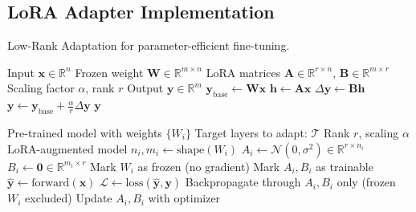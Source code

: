 \subsection{LoRA Adapter Implementation}

Low-Rank Adaptation for parameter-efficient fine-tuning.

\begin{algorithm}[H]
\caption{LoRA Layer Forward Pass}
\label{alg:lora_forward}
\begin{algorithmic}[1]
\REQUIRE Input $\mathbf{x} \in \mathbb{R}^{n}$
\REQUIRE Frozen weight $\mathbf{W} \in \mathbb{R}^{m \times n}$
\REQUIRE LoRA matrices $\mathbf{A} \in \mathbb{R}^{r \times n}$, $\mathbf{B} \in \mathbb{R}^{m \times r}$
\REQUIRE Scaling factor $\alpha$, rank $r$
\ENSURE Output $\mathbf{y} \in \mathbb{R}^{m}$
\STATE $\mathbf{y}_{\text{base}} \gets \mathbf{W} \mathbf{x}$ 
\STATE $\mathbf{h} \gets \mathbf{A} \mathbf{x}$ 
\STATE $\Delta\mathbf{y} \gets \mathbf{B} \mathbf{h}$ 
\STATE $\mathbf{y} \gets \mathbf{y}_{\text{base}} + \frac{\alpha}{r} \Delta\mathbf{y}$ 
\RETURN $\mathbf{y}$
\end{algorithmic}
\end{algorithm}

\begin{algorithm}[H]
\caption{LoRA Initialization and Training}
\label{alg:lora_init}
\begin{algorithmic}[1]
\REQUIRE Pre-trained model with weights $\{W_i\}$
\REQUIRE Target layers to adapt: $\mathcal{T}$
\REQUIRE Rank $r$, scaling $\alpha$
\ENSURE LoRA-augmented model
\STATE {}
    \STATE $n_i, m_i \gets \text{shape}(W_i)$
    \STATE $A_i \gets \mathcal{N}(0, \sigma^2) \in \mathbb{R}^{r \times n_i}$ 
    \STATE $B_i \gets \mathbf{0} \in \mathbb{R}^{m_i \times r}$ 
    \STATE Mark $W_i$ as frozen (no gradient)
    \STATE Mark $A_i, B_i$ as trainable
\ENDFOR
\STATE
\STATE {}
    \STATE $\hat{\mathbf{y}} \gets \text{forward}(\mathbf{x})$ 
    \STATE $\mathcal{L} \gets \text{loss}(\hat{\mathbf{y}}, \mathbf{y})$
    \STATE Backpropagate through $A_i, B_i$ only (frozen $W_i$ excluded)
    \STATE Update $A_i, B_i$ with optimizer
\ENDFOR
\end{algorithmic}
\end{algorithm}

